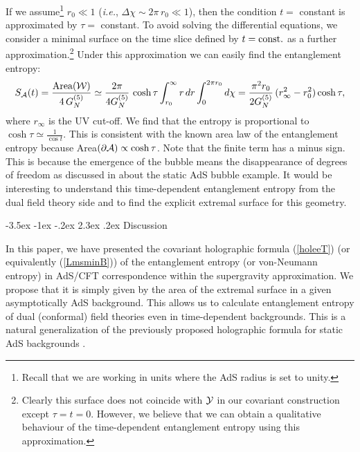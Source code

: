 \documentclass[12pt]{article}
\makeatletter
\renewcommand\section{\@startsection {section}{1}{\z@}%
                                   {-3.5ex \@plus -1ex \@minus -.2ex}%
                                   {2.3ex \@plus.2ex}%
                                   {\normalfont\large\bfseries}}
\def\req#1{(\ref{#1})}
\def\ie{{\it i.e.}}
\def\CA{{\cal A}}
\def\CW{{\cal W}}
\def\CY{{\cal Y}}
\def\f#1#2{{\frac{#1}{#2}}}
\def\f#1#2{{\frac{#1}{#2}}}
\def\Gms{\CW}
\def\Lms{\CY}
\def\rA{\CA}
\def\de{\partial}
\def\f {\frac}
\makeatother
\begin{document}
If we assume\footnote{Recall that we are working in units where the
AdS radius is set to unity.} $r_0 \ll 1 $ (\ie, $\Delta\chi\sim 2\pi
\, r_0 \ll 1$), then the condition $t=$ constant is approximated by
$\tau=$ constant. To avoid solving the differential equations, we
consider a minimal surface on the time slice defined by $t={\rm const}.$
as a further approximation.\footnote{Clearly this surface does not
coincide with $\Lms$ in our covariant construction except
$\tau=t=0$. However, we believe that we can obtain a qualitative
behaviour of the time-dependent entanglement entropy using this
approximation.} Under this approximation we can easily find
the entanglement entropy:
%
\begin{equation}
S_{\rA}(t)=\f{\mbox{Area}(\Gms)}{4\, G^{(5)}_N}\simeq
\f{2\pi}{4G^{(5)}_N}\, \cosh \tau \int^\infty_{r_0} r \,
dr\int^{2\pi r_0}_0 d\chi=\f{\pi^2 r_0}{2G^{(5)}_N}\,
(r^2_{\infty}-r^2_0)\cosh \tau ,
\end{equation}
where $r_{\infty}$ is the UV cut-off. We find that the entropy is
proportional to $\cosh \tau\simeq \f{1}{\cos t}$. This is
consistent with the known area law of the entanglement entropy
because Area$(\de \rA)\propto \cosh \tau$. Note that the finite term
has a minus sign. This is because the emergence of the bubble means
the disappearance of degrees of freedom as discussed in \cite{Nishioka:2006gr}
about the static AdS bubble example. It would be interesting to understand this
 time-dependent entanglement entropy from the dual field theory side and to find
 the explicit extremal surface for this geometry.


\section{Discussion }
\label{discuss}

\hspace{.5cm} In this paper, we have presented the covariant
holographic formula \req{holeeT} (or equivalently \req{LmsminB}) of
the entanglement entropy (or von-Neumann entropy) in AdS/CFT
correspondence within the supergravity approximation. We propose that
it is simply given by the area of the extremal surface in a given
asymptotically AdS background. This allows us to calculate
entanglement entropy of dual (conformal) field theories even in
time-dependent backgrounds. This is a natural generalization of the
previously proposed holographic formula for static AdS backgrounds
\cite{Ryu:2006ef, Ryu:2006bv}.
\end{document}
